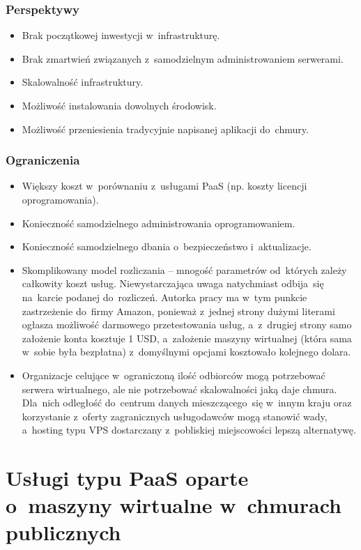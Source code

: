 \documentclass[12pt,a4paper,twoside,titlepage,openright]{book}
\begin{document}
\subsubsection{Perspektywy}
\begin{itemize}
\item Brak początkowej inwestycji w~infrastrukturę.
\item Brak zmartwień związanych z~samodzielnym administrowaniem serwerami.
\item Skalowalność infrastruktury.
\item Możliwość instalowania dowolnych środowisk.
\item Możliwość przeniesienia tradycyjnie napisanej aplikacji do~chmury.
\end{itemize}

\subsubsection{Ograniczenia}
\begin{itemize}
\item Większy koszt w~porównaniu z~usługami PaaS (np. koszty licencji oprogramowania).
\item Konieczność samodzielnego administrowania oprogramowaniem.
\item Konieczność samodzielnego dbania o~bezpieczeństwo i~aktualizacje.
\item Skomplikowany model rozliczania -- mnogość parametrów od~których zależy całkowity koszt usług. Niewystarczająca uwaga natychmiast odbija~się na~karcie podanej do~rozliczeń. Autorka pracy ma w~tym punkcie zastrzeżenie do~firmy Amazon, ponieważ z~jednej strony dużymi literami ogłasza możliwość darmowego przetestowania usług, a~z~drugiej strony samo założenie konta kosztuje 1 USD, a~założenie maszyny wirtualnej (która sama w~sobie była bezpłatna) z~domyślnymi opcjami kosztowało kolejnego dolara. 
\item Organizacje celujące w~ograniczoną ilość odbiorców mogą potrzebować serwera wirtualnego, ale nie potrzebować skalowalności jaką daje chmura. Dla~nich odległość do~centrum danych mieszczącego~się w~innym kraju oraz korzystanie z~oferty zagranicznych usługodawców mogą stanowić wady, a~hosting typu VPS dostarczany z~pobliskiej miejscowości lepszą alternatywę.
\end{itemize}

\section{Usługi typu PaaS oparte o~maszyny wirtualne w~chmurach publicznych}\label{section:podejsciePaas}
\end{document}

